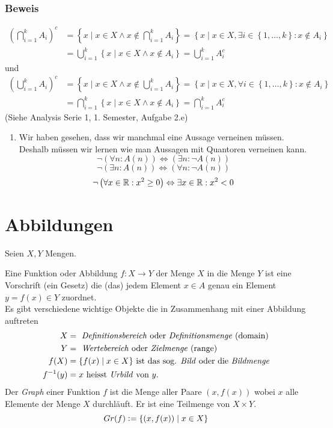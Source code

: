 \subsubsection*{Beweis}
\begin{align*}
{\left( {\bigcap\limits_{i = 1}^k {{A_i}} } \right)^c}
  &=\left\{x \;| \; {x \in X \wedge x\not  \in \bigcap\limits_{i = 1}^k {{A_i}} } \right\} 
  = \left\{ x \;| \; {x \in X, \exists i \in \left\{ {1, \ldots ,k} \right\}:x\not  \in {A_i}} \right\}\\
 &=\bigcup\limits_{i = 1}^k {\left\{ x \;| \; {x \in X \wedge x\not  \in {A_i}} \right\}}   = \bigcup\limits_{i = 1}^k {A_i^c}
\end{align*}
und
\begin{align*}
{\left( {\bigcup\limits_{i = 1}^k {{A_i}} } \right)^c} 
&=\left\{x \;| \; {x \in X \wedge x\not  \in \bigcup\limits_{i = 1}^k {{A_i}} } \right\} 
= \left\{x \;| \; {x \in X, \forall i \in \left\{ {1, \ldots ,k} \right\}:x\not  \in {A_i}} \right\}\\
&=\bigcap\limits_{i = 1}^k {\left\{ {x \;| \;x \in X \wedge x\not  \in {A_i}} \right\}}  
= \bigcap\limits_{i = 1}^k {A_i^c} 
\end{align*}
\noindent (Siehe Analysis Serie 1, 1. Semester, Aufgabe 2.e)
\begin{enumerate}[($\ast$)]
\item Wir haben gesehen, dass wir manchmal eine Aussage verneinen müssen. Deshalb müssen wir lernen wie man Aussagen mit Quantoren verneinen kann.
\[\neg\left(\forall n:A(n)\right)\Leftrightarrow\left(\exists n:\neg A(n)\right)\]
\[\neg\left(\exists n:A(n)\right)\Leftrightarrow\left(\forall n:\neg A(n)\right)\]
\[\neg\left(\forall x\in \mathbb{R}:x^2\geq 0\right)\Leftrightarrow\exists x\in\mathbb{R}:x^2<0\]
\end{enumerate}
\section{Abbildungen}
Seien $X,Y$ Mengen. 

\begin{definition}{1.9}
Eine Funktion oder Abbildung $f:X\to Y$ der Menge $X$ in die Menge $Y$ ist eine Vorschrift (ein Gesetz) die (das) jedem Element $x\in A$ genau ein Element $y=f(x)\in Y$ zuordnet. \\

Es gibt verschiedene wichtige Objekte die in Zusammenhang mit einer Abbildung auftreten 
\begin{align*}
X &= \text{ \emph{Definitionsbereich} oder \emph{Definitionsmenge} (domain)} \\
Y&= \text{ \emph{Wertebereich} oder \emph{Zielmenge} (range)} \\
f(X) &=\{f(x)\mid x\in X\}\text{ ist das sog. \emph{Bild} oder die \emph{Bildmenge}} \\
f^{-1}(y) &= x\text{ heisst \emph{Urbild} von }y. \end{align*}
Der \emph{Graph} einer Funktion $f$ ist die Menge aller Paare $(x, f(x))$ wobei $x$ alle Elemente der Menge $X$ durchläuft. Er ist eine Teilmenge von $X \times Y$.
\[ Gr(f) \vcentcolon= \{ (x, f(x)) \mid x \in X\} \]
\end{definition}


